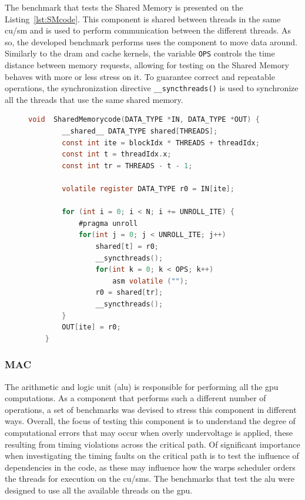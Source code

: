 The benchmark that tests the Shared Memory is presented on the Listing~\ref{lst:SMcode}. This component is shared between threads in the same \acrshort{cu}/\acrshort{sm} and is used to perform communication between the different threads. As so, the developed benchmark performs uses the component to move data around. Similarly to the \acrshort{dram} and cache kernels, the variable \texttt{OPS} controls the time distance between memory requests, allowing for testing on the Shared Memory behaves with more or less stress on it. To guarantee correct and repeatable operations, the synchronization directive \texttt{\_\_syncthreads()} is used to synchronize all the threads that use the same shared memory.

\begin{figure}[h]
    \begin{lstlisting}[language=C, caption=Shared Memory Benchmark code, label=lst:SMcode, basicstyle=\footnotesize\ttfamily, abovecaptionskip=0pt, captionpos=b]
    void  SharedMemorycode(DATA_TYPE *IN, DATA_TYPE *OUT) {
        __shared__ DATA_TYPE shared[THREADS];
        const int ite = blockIdx * THREADS + threadIdx;
        const int t = threadIdx.x;
        const int tr = THREADS - t - 1;
        
        volatile register DATA_TYPE r0 = IN[ite];
        
        for (int i = 0; i < N; i += UNROLL_ITE) {
            #pragma unroll
            for(int j = 0; j < UNROLL_ITE; j++)  
                shared[t] = r0;
                __syncthreads();
                for(int k = 0; k < OPS; k++) 
                    asm volatile ("");
                r0 = shared[tr];
                __syncthreads();
        }
        OUT[ite] = r0;
    }
    \end{lstlisting}
\end{figure}

\subsubsection{MAC}

The arithmetic and logic unit (\acrshort{alu}) is responsible for performing all the \acrshort{gpu} computations.  As a component that performs such a different number of operations, a set of benchmarks was devised to stress this component in different ways. Overall, the focus of testing this component is to understand the degree of computational errors that may occur when overly undervoltage is applied, these resulting from timing violations across the critical path. Of significant importance when investigating the timing faults on the critical path is to test the influence of dependencies in the code, as these may influence how the warps scheduler orders the threads for execution on the \acrshort{cu}/\acrshort{sm}s. The benchmarks that test the \acrshort{alu} were designed to use all the available threads on the \acrshort{gpu}.

